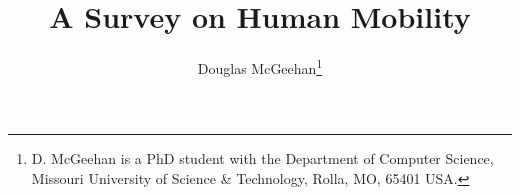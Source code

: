 \documentclass[journal]{IEEEtran}
\begin{document}
%
\title{A Survey on Human Mobility}
%
%
%

\author{Douglas McGeehan\thanks{D. McGeehan is a PhD student with the Department
of Computer Science, Missouri University of Science \& Technology, Rolla,
MO, 65401 USA.}}

% 
%



% 




\end{document}

